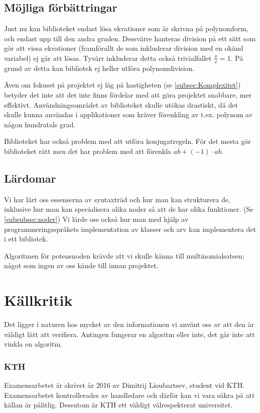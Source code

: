 \documentclass[12pt,a4paper]{article}
\begin{document}
\subsection{Möjliga förbättringar}
Just nu kan biblioteket endast lösa ekvationer som är skrivna på polynomform, och endast upp till den andra graden. Dessvärre hanteras division på ett sätt som gör att vissa ekvationer (framförallt de som inkluderar division med en okänd variabel) ej går att lösas. Tyvärr inkluderar detta också trivialfallet \( \frac{x}{x} = 1 \). På grund av detta kan bibliotek ej heller utföra polynomdivision.
\par
Även om fokuset på projektet ej låg på hastigheten (se \ref{subsec:Komplexitet}) betyder det inte att det inte finns fördelar med att göra projektet snabbare, mer effektivt. Användningsområdet av biblioteket skulle utökas drastiskt, då det skulle kunna användas i applikationer som kräver förenkling av t.ex. polynom av någon hundratals grad.
\par
Biblioteket har också problem med att utföra konjugatregeln. För det mesta gör biblioteket rätt men det har problem med att förenkla \( ab + (-1) \cdot ab\).
\subsection{Lärdomar}
Vi har lärt oss essenserna av syntaxträd och hur man kan strukturera de, inklusive hur man kan specialisera olika noder så att de har olika funktioner. (Se \ref{subsubsec:noder}) Vi lärde oss också hur man med hjälp av programmeringsspråkets implementation av klasser och arv kan implementera det i ett bibliotek.
\par
Algoritmen för potensnoden krävde att vi skulle känna till multinomialsatsen; något som ingen av oss kände till innan projektet.

\section{Källkritik}
Det ligger i naturen hos mycket av den informationen vi använt oss av att den är väldigt lätt att verifiera. Antingen fungerar en algoritm eller inte, det går inte att vinkla en algoritm. 
\subsubsection{KTH}
Examensarbetet är skrivet år 2016 av Dimitrij Lioubartsev, student vid KTH. Examensarbetet kontrollerades av handledare och därför kan vi vara säkra på att källan är pålitlig. Dessutom är KTH ett väldigt välrespekterat universitet.
\end{document}
